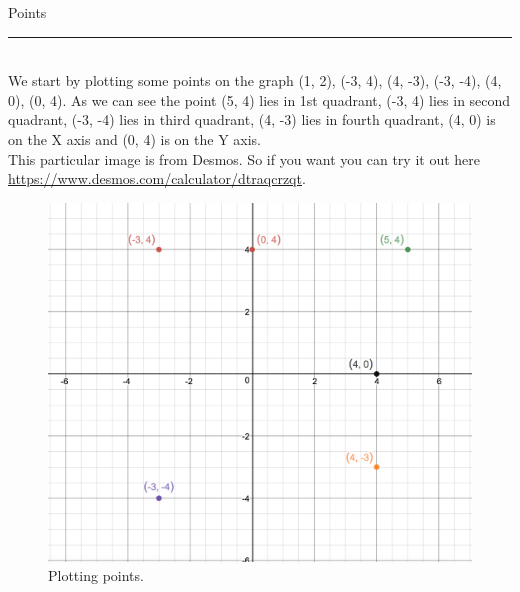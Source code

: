 \documentclass[twoside,openright]{report}
\begin{document}
{\Huge Points }\\
\rule{12cm}{0.05cm}\\
\newline
\newline
We start by plotting some points on the graph (1, 2), (-3, 4), (4, -3), (-3, -4), (4, 0), (0, 4).
As we can see the point (5, 4) lies in 1st quadrant, (-3, 4) lies in second quadrant, (-3, -4) lies in third quadrant, (4, -3) lies in fourth quadrant, (4, 0) is on the X axis and (0, 4) is on the Y axis.\\
This particular image is from Desmos. So if you want you can try it out here \url{https://www.desmos.com/calculator/dtraqcrzqt}.\\
\begin{figure}[h!]
  \includegraphics[width=\linewidth]{img/image2.png}
  \caption{Plotting points.}
  \label{fig:axis1}
\end{figure}
\clearpage
{} 
 \setcounter{page}{2}
\end{document}
